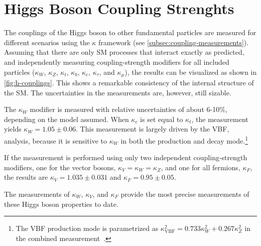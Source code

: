 \FloatBarrier

\section{Higgs Boson Coupling Strenghts}
The couplings of the Higgs boson to other fundamental particles are measured for different scenarios using the $\kappa$ framework (see \cref{subsec:coupling-measurements}).
Assuming that there are only SM processes that interact exactly as predicted, and independently measuring coupling-strength modifiers for all included particles ($\kappa_W$, $\kappa_Z$, $\kappa_t$, $\kappa_b$, $\kappa_c$, $\kappa_\tau$, and $\kappa_\mu$), the results can be visualized as shown in \cref{fig:h-couplings}. 
This shows a remarkable consistency of the internal structure of the SM. 
The uncertainties in the measurements are, however, still sizable. 

The $\kappa_W$ modifier is measured with relative uncertainties of about 6-10\%, depending on the model assumed. 
When $\kappa_c$ is set equal to $\kappa_t$, the measurement yields $\kappa_W = 1.05 \pm 0.06$.
This measurement is largely driven by the VBF, \HWW analysis, because it is sensitive to $\kappa_W$ in both the production and decay mode.\footnote{The VBF production mode is parametrized as $\kappa_\mathrm{VBF}^2 = 0.733 \kappa^2_W + 0.267 \kappa^2_Z$ in the combined measurement~\cite{NaturePaper}.}

If the measurement is performed using only two independent coupling-strength modifiers, one for the vector bosons, $\kappa_V = \kappa_W = \kappa_Z$, and one for all fermions, $\kappa_F$, the results are $\kappa_V = 1.035 \pm 0.031$ and $\kappa_F = 0.95 \pm 0.05$. 

The measurements of $\kappa_W$, $\kappa_V$, and $\kappa_F$ provide the most precise measurements of these Higgs boson properties to date.

